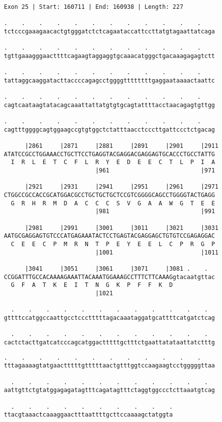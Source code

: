 \documentclass{article}
\begin{document}
\begin{Verbatim}[fontfamily=courier]
Exon 25 | Start: 160711 | End: 160938 | Length: 227

.    .    .    .    .    .    .    .    .    .    .    .    
tctcccgaaagaacactgtgggatctctcagaataccattccttatgtagaattatcaga

.    .    .    .    .    .    .    .    .    .    .    .    
tgttgaaagggaacttttcagaagtaggaggtgcaaacatgggctgacaaagagagtctt

.    .    .    .    .    .    .    .    .    .    .    .    
tattaggcaaggatacttaccccagagcctggggttttttttgaggaataaaactaattc

.    .    .    .    .    .    .    .    .    .    .    .    
cagtcaataagtatacagcaaattattatgtgtgcagtattttacctaacagagtgttgg

.    .    .    .    .    .    .    .    .    .    .    .    
cagtttggggcagtggaagccgtgtggctctatttaacctcccttgattccctctgacag

      |2861     |2871     |2881     |2891     |2901     |2911
ATATCCGCCTGGAAACCTGCTTCCTGAGGTACGAGGACGAGGAGTGCACCCTGCCTATTG
  I  R  L  E  T  C  F  L  R  Y  E  D  E  E  C  T  L  P  I  A
                          |961                          |971

      |2921     |2931     |2941     |2951     |2961     |2971
CTGGCCGCCACCGCATGGACGCCTGCTGCTGCTCCGTCGGGGCAGCCTGGGGTACTGAGG
  G  R  H  R  M  D  A  C  C  C  S  V  G  A  A  W  G  T  E  E
                          |981                          |991

      |2981     |2991     |3001     |3011     |3021     |3031
AATGCGAGGAGTGTCCCATGAGAAATACTCCTGAGTACGAGGAGCTGTGTCCGAGAGGAC
  C  E  E  C  P  M  R  N  T  P  E  Y  E  E  L  C  P  R  G  P
                          |1001                         |1011

      |3041     |3051     |3061     |3071     |3081 .    .  
CCGGATTTGCCACAAAAGAAATTACAAATGGAAAGCCTTTCTTCAAAGgtacaatgttac
  G  F  A  T  K  E  I  T  N  G  K  P  F  F  K  D            
                          |1021                             

  .    .    .    .    .    .    .    .    .    .    .    .  
gttttccatggccaattgcctccctttttagacaaataggatgcattttcatgatctcag

  .    .    .    .    .    .    .    .    .    .    .    .  
cactctacttgatcatcccagcatggactttttgctttctgaattatataattatctttg

\end{Verbatim}
\newpage
\begin{Verbatim}[fontfamily=courier]
  .    .    .    .    .    .    .    .    .    .    .    .  
tttagaaaagtatgaactttttgtttttaactgtttggtccaagaagtcctgggggttaa

  .    .    .    .    .    .    .    .    .    .    .    .  
aattgttctgtatggagagatagtttcagatagtttctaggtggccctcttaaatgtcag

  .    .    .    .    .    .    .    .    .    .
ttacgtaaactcaaaggaactttaattttgcttccaaaagctatggta
\end{Verbatim}
\end{document}
